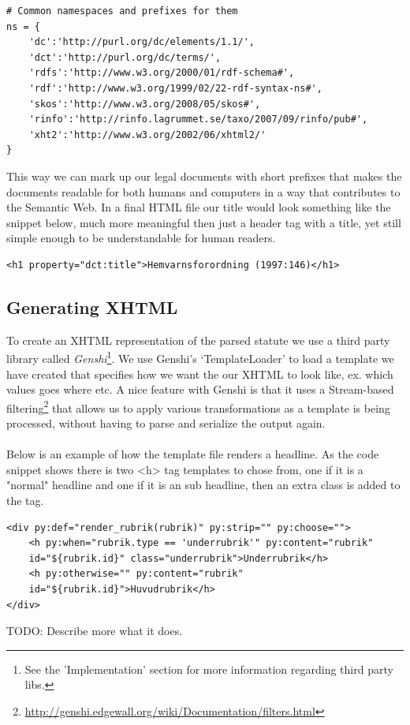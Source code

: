 \begin{verbatim}
# Common namespaces and prefixes for them
ns = {
    'dc':'http://purl.org/dc/elements/1.1/',
    'dct':'http://purl.org/dc/terms/',
    'rdfs':'http://www.w3.org/2000/01/rdf-schema#',
    'rdf':'http://www.w3.org/1999/02/22-rdf-syntax-ns#',
    'skos':'http://www.w3.org/2008/05/skos#',
    'rinfo':'http://rinfo.lagrummet.se/taxo/2007/09/rinfo/pub#',
    'xht2':'http://www.w3.org/2002/06/xhtml2/'
}
\end{verbatim} 
\linebreak
\newline
This way we can mark up our legal documents with short prefixes that makes the documents readable for both humans and computers in a way that contributes to the Semantic Web. In a final HTML file our title would look something like the snippet below, much more meaningful then just a header tag with a title, yet still simple enough to be understandable for human readers.\\
\begin{verbatim}
<h1 property="dct:title">Hemvarnsforordning (1997:146)</h1>
\end{verbatim}
\linebreak
\newline
\subsection{Generating XHTML}
To create an XHTML representation of the parsed statute we use a third party library called \textit{Genshi}\footnote{See the 'Implementation' section for more information regarding third party libs.}. We use Genshi’s ‘TemplateLoader’ to load a template we have created that specifies how we want the our XHTML to look like, ex. which values goes where etc. A nice feature with Genshi is that it uses a Stream-based filtering\footnote{\url{http://genshi.edgewall.org/wiki/Documentation/filters.html}} that allows us to apply various transformations as a template is being processed, without having to parse and serialize the output again.\\\\
Below is an example of how the template file renders a headline. As the code
snippet shows there is two <h> tag templates to chose from, one if it is a "normal" headline and one if it is an sub headline, then an extra class is added to the tag.\\
\begin{verbatim}
<div py:def="render_rubrik(rubrik)" py:strip="" py:choose="">
    <h py:when="rubrik.type == 'underrubrik'" py:content="rubrik"
	id="${rubrik.id}" class="underrubrik">Underrubrik</h>
    <h py:otherwise="" py:content="rubrik"
	id="${rubrik.id}">Huvudrubrik</h>
</div>
\end{verbatim}
\linebreak  
\newline
TODO: Describe more what it does.\\
